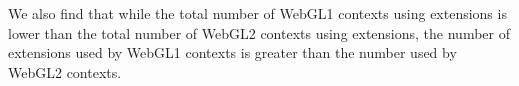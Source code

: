We also find that while the total number of WebGL1 contexts using extensions is lower than the total number of WebGL2 contexts using extensions, the number of extensions used by WebGL1 contexts is greater than the number used by WebGL2 contexts.

